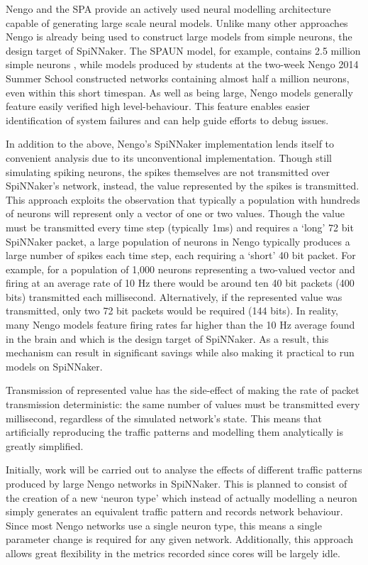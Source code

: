 		Nengo and the SPA provide an actively used neural modelling architecture
		capable of generating large scale neural models. Unlike many other
		approaches Nengo is already being used to construct large models from simple
		neurons, the design target of SpiNNaker. The SPAUN model, for example,
		contains 2.5 million simple neurons \cite{eliasmith12}, while models
		produced by students at the two-week Nengo 2014 Summer School constructed
		networks containing almost half a million neurons, even within this short
		timespan. As well as being large, Nengo models generally feature easily
		verified high level-behaviour. This feature enables easier identification of
		system failures and can help guide efforts to debug issues.
		
		In addition to the above, Nengo's SpiNNaker implementation lends itself to
		convenient analysis due to its unconventional implementation. Though still
		simulating spiking neurons, the spikes themselves are not transmitted over
		SpiNNaker's network, instead, the value represented by the spikes is
		transmitted. This approach exploits the observation that typically a
		population with hundreds of neurons will represent only a vector of one or
		two values. Though the value must be transmitted every time step (typically
		1ms) and requires a `long' 72 bit SpiNNaker packet, a large population of
		neurons in Nengo typically produces a large number of spikes each time step,
		each requiring a `short' 40 bit packet. For example, for a population of
		1,000 neurons representing a two-valued vector and firing at an average rate
		of 10 Hz there would be around ten 40 bit packets (400 bits) transmitted
		each millisecond.  Alternatively, if the represented value was transmitted,
		only two 72 bit packets would be required (144 bits). In reality, many Nengo
		models feature firing rates far higher than the 10 Hz average found in the
		brain and which is the design target of SpiNNaker. As a result, this
		mechanism can result in significant savings while also making it practical
		to run models on SpiNNaker.
		
		Transmission of represented value has the side-effect of making the rate of
		packet transmission deterministic: the same number of values must be
		transmitted every millisecond, regardless of the simulated network's state.
		This means that artificially reproducing the traffic patterns and modelling
		them analytically is greatly simplified.
		
		Initially, work will be carried out to analyse the effects of different
		traffic patterns produced by large Nengo networks in SpiNNaker. This is
		planned to consist of the creation of a new `neuron type' which instead of
		actually modelling a neuron simply generates an equivalent traffic pattern
		and records network behaviour. Since most Nengo networks use a single neuron
		type, this means a single parameter change is required for any given
		network. Additionally, this approach allows great flexibility in the metrics
		recorded since cores will be largely idle.
		
